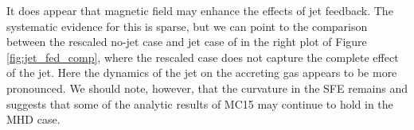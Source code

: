 \documentclass[../dissertation.tex]{subfiles}
\begin{document}
It does appear that magnetic field may enhance the effects of jet feedback.  The systematic evidence for this is sparse, but we can point to the comparison between the rescaled no-jet case and jet case of \citet{2015MNRAS.450.4035F} in the right plot of Figure \ref{fig:jet_fed_comp}, where the rescaled case does not capture the complete effect of the jet.  Here the dynamics of the jet on the accreting gas appears to be more pronounced.  We should note, however, that the curvature in the SFE remains and suggests that some of the analytic results of MC15 may continue to hold in the MHD case.

%
%
%
%
%
\end{document}
